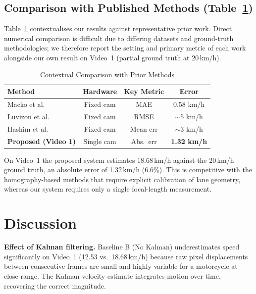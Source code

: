 \documentclass[conference]{IEEEtran}
\begin{document}
\subsection{Comparison with Published Methods (Table~\ref{tab:comparison})}
Table~\ref{tab:comparison} contextualises our results against
representative prior work. Direct numerical comparison is
difficult due to differing datasets and ground-truth
methodologies; we therefore report the setting and primary
metric of each work alongside our own result on Video~1
(partial ground truth at 20\,km/h).

\begin{table}[t]
\caption{Contextual Comparison with Prior Methods}
\label{tab:comparison}
\centering
\renewcommand{\arraystretch}{1.2}
\begin{tabular}{lccc}
\toprule
\textbf{Method} & \textbf{Hardware} &
\textbf{Key Metric} & \textbf{Error} \\
\midrule
Macko et al.\ \cite{macko2020speed}
  & Fixed cam & MAE & 0.58 km/h \\
Luvizon et al.\ \cite{luvizon2017speed}
  & Fixed cam & RMSE & $\sim$5 km/h \\
Hashim et al.\ \cite{hashim2024homography}
  & Fixed cam & Mean err & $\sim$3 km/h \\
\textbf{Proposed (Video 1)}
  & Single cam & Abs.\ err & \textbf{1.32 km/h} \\
\bottomrule
\end{tabular}
\end{table}

On Video~1 the proposed system estimates 18.68\,km/h against
the 20\,km/h ground truth, an absolute error of 1.32\,km/h
(6.6\%). This is competitive with the homography-based methods
that require explicit calibration of lane geometry, whereas our
system requires only a single focal-length measurement.

\section{Discussion}

\textbf{Effect of Kalman filtering.}
Baseline B (No Kalman) underestimates speed significantly on
Video~1 (12.53 vs.\ 18.68\,km/h) because raw pixel
displacements between consecutive frames are small and highly
variable for a motorcycle at close range. The Kalman velocity
estimate integrates motion over time, recovering the correct
magnitude.
\end{document}
